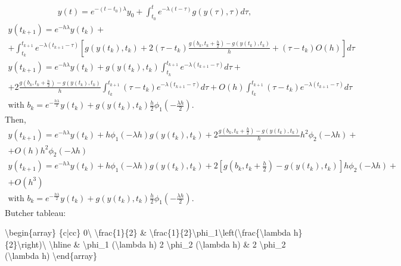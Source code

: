 \documentclass[letterpaper,10pt,english]{jupyterBook}
\begin{document}
\begin{equation*}
\begin{split}
y(t) = e^{-(t-t_0) \lambda}y_0 + \int_{t_0}^t e^{-\lambda(t-\tau)} g(y(\tau), \tau) d\tau,
\end{split}
\end{equation*}\begin{equation*}
\begin{split}
  y(t_{k+1}) = e^{-h \lambda}y(t_k) + \\
    + \int_{t_k}^{t_{k+1}} e^{-\lambda(t_{k+1}-\tau)} \left[ g(y(t_k), t_k) + 2(\tau - t_k) \frac{g\left(b_k, t_k + \frac{h}{2}\right) - g(y(t_k), t_k)}{h} + (\tau - t_k)O(h) \right] d\tau
\end{split}
\end{equation*}\begin{equation*}
\begin{split}
y(t_{k+1}) = e^{-h \lambda} y(t_k) + g(y(t_k), t_k)\int_{t_k}^{t_{k+1}} e^{-\lambda(t_{k+1}-\tau)} d \tau + \\
  + 2\frac{g\left(b_k, t_k + \frac{h}{2}\right) - g(y(t_k), t_k)}{h} \int_{t_k}^{t_{k+1}} (\tau - t_k) e^{-\lambda(t_{k+1}-\tau)} d \tau + O(h)\int_{t_k}^{t_{k+1}} (\tau - t_k) e^{-\lambda(t_{k+1}-\tau)} d \tau \\
  \text{with } b_k =e^{-\frac{h \lambda}{2}}y(t_k) + g(y(t_k), t_k) \frac{h}{2} \phi_1\left( -\frac{\lambda h}{2} \right).
\end{split}
\end{equation*}
\sphinxAtStartPar
Then,
\begin{equation*}
\begin{split}
y(t_{k+1}) = e^{-h \lambda} y(t_k) +
  h \phi_1 (-\lambda h) g(y(t_k), t_k) +
  2\frac{g\left(b_k, t_k + \frac{h}{2}\right) - g(y(t_k), t_k)}{h} h^2 \phi_2 (-\lambda h) + \\
  + O(h)h^2 \phi_2 (-\lambda h) \\
  y(t_{k+1}) = e^{-h \lambda} y(t_k) +
  h \phi_1 (-\lambda h) g(y(t_k), t_k) +
  2 \left[g\left(b_k, t_k + \frac{h}{2}\right) - g(y(t_k), t_k) \right] h \phi_2 (-\lambda h) + \\
  + O(h^3) \\
  \text{with } b_k =e^{-\frac{h \lambda}{2}}y(t_k) + g(y(t_k), t_k) \frac{h}{2} \phi_1\left( -\frac{\lambda h}{2} \right).
\end{split}
\end{equation*}
\sphinxAtStartPar
Butcher tableau:

\sphinxAtStartPar
\textbackslash{}begin\{array\}
\{c|cc\}
0\textbackslash{}
\textbackslash{}frac\{1\}\{2\} \& \textbackslash{}frac\{1\}\{2\}\textbackslash{}phi\_1\textbackslash{}left(\sphinxhyphen{}\textbackslash{}frac\{\textbackslash{}lambda h\}\{2\}\textbackslash{}right)\textbackslash{}
\textbackslash{}hline
\& \textbackslash{}phi\_1 (\sphinxhyphen{}\textbackslash{}lambda h) \sphinxhyphen{} 2 \textbackslash{}phi\_2 (\sphinxhyphen{}\textbackslash{}lambda h) \& \sphinxhyphen{}2 \textbackslash{}phi\_2 (\sphinxhyphen{}\textbackslash{}lambda h)
\textbackslash{}end\{array\}
\end{document}
